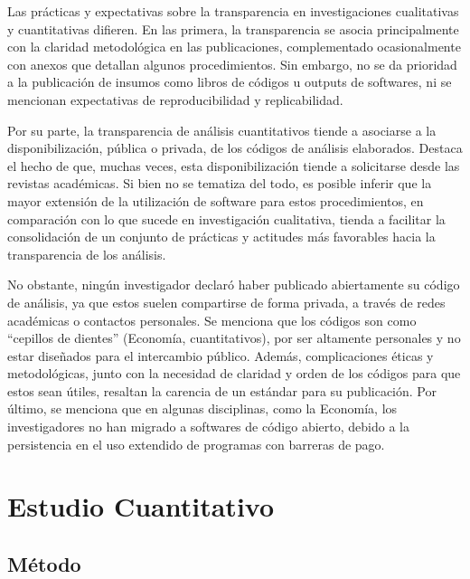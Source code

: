 \documentclass[
  letterpaper,
  DIV=11,
  numbers=noendperiod]{scrreprt}
\begin{document}
Las prácticas y expectativas sobre la transparencia en investigaciones
cualitativas y cuantitativas difieren. En las primera, la transparencia
se asocia principalmente con la claridad metodológica en las
publicaciones, complementado ocasionalmente con anexos que detallan
algunos procedimientos. Sin embargo, no se da prioridad a la publicación
de insumos como libros de códigos u outputs de softwares, ni se
mencionan expectativas de reproducibilidad y replicabilidad.

Por su parte, la transparencia de análisis cuantitativos tiende a
asociarse a la disponibilización, pública o privada, de los códigos de
análisis elaborados. Destaca el hecho de que, muchas veces, esta
disponibilización tiende a solicitarse desde las revistas académicas. Si
bien no se tematiza del todo, es posible inferir que la mayor extensión
de la utilización de software para estos procedimientos, en comparación
con lo que sucede en investigación cualitativa, tienda a facilitar la
consolidación de un conjunto de prácticas y actitudes más favorables
hacia la transparencia de los análisis.

No obstante, ningún investigador declaró haber publicado abiertamente su
código de análisis, ya que estos suelen compartirse de forma privada, a
través de redes académicas o contactos personales. Se menciona que los
códigos son como ``cepillos de dientes'' (Economía, cuantitativos), por
ser altamente personales y no estar diseñados para el intercambio
público. Además, complicaciones éticas y metodológicas, junto con la
necesidad de claridad y orden de los códigos para que estos sean útiles,
resaltan la carencia de un estándar para su publicación. Por último, se
menciona que en algunas disciplinas, como la Economía, los
investigadores no han migrado a softwares de código abierto, debido a la
persistencia en el uso extendido de programas con barreras de pago.

\hypertarget{estudio-cuantitativo}{%
\chapter{Estudio Cuantitativo}\label{estudio-cuantitativo}}

\hypertarget{muxe9todo-1}{%
\section{Método}\label{muxe9todo-1}}
\end{document}
